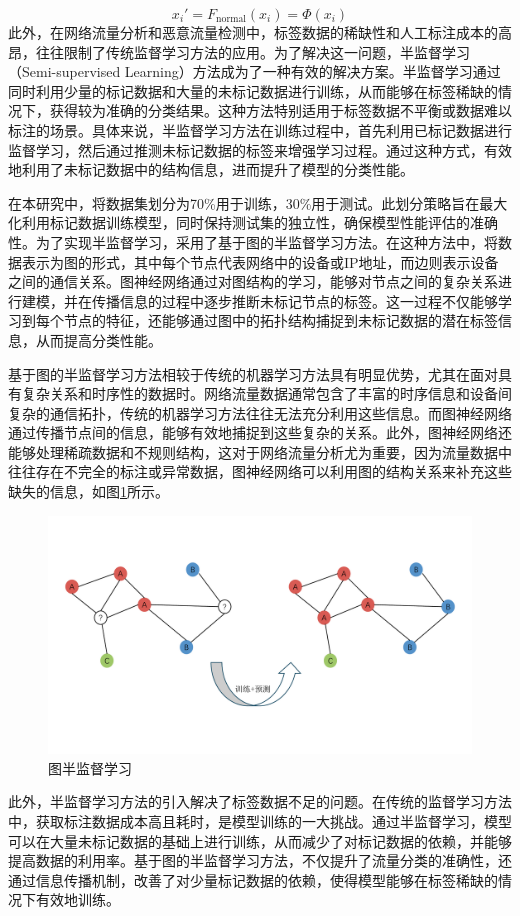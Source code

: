 \documentclass[promaster]{thesis-uestc}
\begin{document}
\begin{equation}
x_i' = F_{\text{normal}}(x_i) = \Phi(x_i)
\label{x_ii}
\end{equation}
此外，在网络流量分析和恶意流量检测中，标签数据的稀缺性和人工标注成本的高昂，往往限制了传统监督学习方法的应用。为了解决这一问题，半监督学习（Semi-supervised Learning）方法成为了一种有效的解决方案。半监督学习通过同时利用少量的标记数据和大量的未标记数据进行训练，从而能够在标签稀缺的情况下，获得较为准确的分类结果。这种方法特别适用于标签数据不平衡或数据难以标注的场景。具体来说，半监督学习方法在训练过程中，首先利用已标记数据进行监督学习，然后通过推测未标记数据的标签来增强学习过程。通过这种方式，有效地利用了未标记数据中的结构信息，进而提升了模型的分类性能。

在本研究中，将数据集划分为70\%用于训练，30\%用于测试。此划分策略旨在最大化利用标记数据训练模型，同时保持测试集的独立性，确保模型性能评估的准确性。为了实现半监督学习，采用了基于图的半监督学习方法。在这种方法中，将数据表示为图的形式，其中每个节点代表网络中的设备或IP地址，而边则表示设备之间的通信关系。图神经网络通过对图结构的学习，能够对节点之间的复杂关系进行建模，并在传播信息的过程中逐步推断未标记节点的标签。这一过程不仅能够学习到每个节点的特征，还能够通过图中的拓扑结构捕捉到未标记数据的潜在标签信息，从而提高分类性能。

基于图的半监督学习方法相较于传统的机器学习方法具有明显优势，尤其在面对具有复杂关系和时序性的数据时。网络流量数据通常包含了丰富的时序信息和设备间复杂的通信拓扑，传统的机器学习方法往往无法充分利用这些信息。而图神经网络通过传播节点间的信息，能够有效地捕捉到这些复杂的关系。此外，图神经网络还能够处理稀疏数据和不规则结构，这对于网络流量分析尤为重要，因为流量数据中往往存在不完全的标注或异常数据，图神经网络可以利用图的结构关系来补充这些缺失的信息，如图\ref{halfsuppervised}所示。

\begin{figure}[h!]
    \centering
    \includegraphics[width=1\linewidth]{./pic/基于图半监督学习方法(大字版).pdf}
    \caption{图半监督学习}
    \label{halfsuppervised}
\end{figure}
此外，半监督学习方法的引入解决了标签数据不足的问题。在传统的监督学习方法中，获取标注数据成本高且耗时，是模型训练的一大挑战。通过半监督学习，模型可以在大量未标记数据的基础上进行训练，从而减少了对标记数据的依赖，并能够提高数据的利用率。基于图的半监督学习方法，不仅提升了流量分类的准确性，还通过信息传播机制，改善了对少量标记数据的依赖，使得模型能够在标签稀缺的情况下有效地训练。
\end{document}
